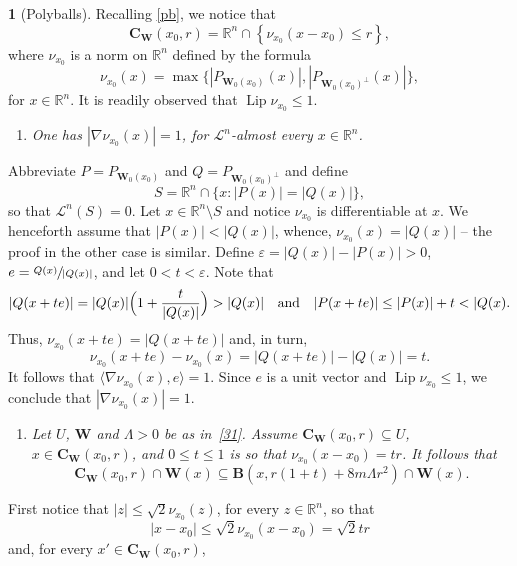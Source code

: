 \documentclass[11pt]{article}
\newcounter{cdrthm}[section]
\theoremstyle{definition}
\theoremstyle{jepanonymous}
\newtheorem{jepempty}[cdrthm]{}
\newenvironment{enonce}[2][remark]{\begin{jepempty}[#2]}{\end{jepempty}}
\theoremstyle{plain}
\newcommand{\quand}{\quad\text{and}\quad}
\newenvironment{Empty}[2][\null]{%
\begin{enonce}[remark]{#1}#2}
{\end{enonce}}
\newcommand{\R}{\mathbb{R}}
\newcommand{\Rn}{\R^n}
\newcommand{\calL}{\mathscr{L}}
\newcommand{\bB}{{\boldsymbol{B}}}
\newcommand{\bC}{{\boldsymbol{C}}}
\newcommand{\bW}{{\boldsymbol{W}}}
\DeclareMathOperator{\rmLip}{\mathrm{Lip}}
\let\veps\varepsilon
\let\la\langle
\let\ra\rangle
\let\subset\subseteq
\begin{document}
\begin{Empty}[Polyballs]
\label{pb.complement}
Recalling \ref{pb}, we notice that
\begin{equation*}
\bC_{\bW}(x_0,r) = \Rn \cap \left\{ \nu_{x_0}(x-x_0) \leq r \right\},
\end{equation*}
where $\nu_{x_0}$ is a norm on $\Rn$ defined by the formula
\begin{equation*}
\nu_{x_0}(x) = \max \bigl\{ \left| P_{\bW_0(x_0)}(x) \right|, \left| P_{\bW_0(x_0)^\perp}(x) \right| \bigr\},
\end{equation*}
for $x \in \Rn$.
It is readily observed that $\rmLip \nu_{x_0} \leq 1$.
\begin{enumerate}
\item\label{enum:8.3.1} \emph{One has $|\nabla \nu_{x_0}(x) | = 1$, for $\calL^n$-almost every $x \in \Rn$.}
\end{enumerate}
\par
Abbreviate $P = P_{\bW_0(x_0)}$ and $Q = P_{\bW_0(x_0)^\perp}$ and define
\[
S = \Rn \cap \{ x: |P(x)| = |Q(x)| \},
\]
so that $\calL^n(S)=0$.
Let $x \in \Rn \setminus S$ and notice $\nu_{x_0}$ is differentiable at $x$.
We henceforth assume that $|P(x)| < |Q(x)|$, whence, $\nu_{x_0}(x) = |Q(x)|$ -- the proof in the other case is similar.
Define $\veps = |Q(x)| - |P(x)| > 0$, $e = \sfrac{Q(x)}{|Q(x)|}$, and let $0 < t < \veps$.
Note that
\[
|Q(x + te)| = |Q(x)| \Bigl(1 + \frac{t}{|Q(x)|}\Bigr) > |Q(x)|\quand|P(x + te)| \leq |P(x)| + t < |Q(x).
\]
Thus, $\nu_{x_0}(x+te) = |Q(x+te)|$ and, in turn,
\[
\nu_{x_0}(x+te) - \nu_{x_0}(x) = |Q(x+te)| - |Q(x)| = t.
\]
It follows that $\la \nabla \nu_{x_0}(x), e \ra = 1$.
Since $e$ is a unit vector and $\rmLip \nu_{x_0} \leq 1$, we conclude that $|\nabla \nu_{x_0}(x)| = 1$.
\begin{enumerate}
\item\label{enum:8.3.2} \emph{Let $U$, $\bW$ and $\Lambda > 0$ be as in~\ref{31}. Assume $\bC_{\bW}(x_0,r) \subset U$, $x \in \bC_{\bW}(x_0,r)$, and $0 \leq t \leq 1$ is so that $\nu_{x_0}(x-x_0) = tr$. It follows that
\begin{equation*}
\bC_{\bW}(x_0,r) \cap \bW(x) \subset \bB \left(x, r(1+t) + 8m\Lambda r^2\right) \cap \bW(x).
\end{equation*}
}
\end{enumerate}
\par
First notice that $|z| \leq \sqrt{2} \nu_{x_0}(z)$, for every $z \in \Rn$, so that
\[
|x-x_0| \leq \sqrt{2} \nu_{x_0}(x-x_0) = \sqrt{2} tr
\]
and, for every $x' \in \bC_\bW(x_0,r)$,

\end{Empty}
\end{document}
